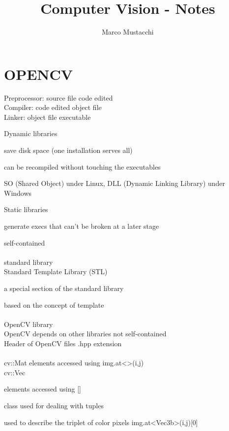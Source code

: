 \documentclass[11pt,english]{article}
\title:
\title{\vspace{-1.6cm}\textbf{Computer Vision - Notes}}
\author{Marco Mustacchi}
\date{}
\begin{document}
\maketitle

\section{OPENCV}

Preprocessor: source file \makebox[0.5cm]{\textrightarrow} code edited \\
Compiler: code edited \makebox[0.5cm]{\textrightarrow} object file \\
Linker: object file \makebox[0.5cm]{\makebox[0.5cm]{\textrightarrow}} executable \\

\medskip

Dynamic libraries \par
    \makebox[1.5cm]{\textrightarrow}  save disk space (one installation serves all)\par
    \makebox[1.5cm]{\textrightarrow}  can be recompiled without touching the executables\par
    \makebox[1.5cm]{\textrightarrow}  SO (Shared Object) under Linux, DLL (Dynamic Linking Library) under Windows\par

Static libraries \par
    \makebox[1.5cm]{\textrightarrow}  generate execs that can't be broken at a later stage\par
    \makebox[1.5cm]{\textrightarrow}  self-contained\\
\\
standard library \\
Standard Template Library (STL) \par
    \makebox[1.5cm]{\textrightarrow}  a special section of the standard library\par
    \makebox[1.5cm]{\textrightarrow}  based on the concept of template\\
\\
OpenCV library \\
OpenCV depends on other libraries \makebox[0.5cm]{\textrightarrow} not self-contained \\
Header of OpenCV files \makebox[0.5cm]{\textrightarrow} .hpp extension \\
\\
cv::Mat \makebox[0.5cm]{\textrightarrow} elements accessed using img.at<>(i,j) \\
cv::Vec \par
    \makebox[1.5cm]{\textrightarrow}  elements accessed using [] \par
    \makebox[1.5cm]{\textrightarrow}  class used for dealing with tuples\par
    \makebox[1.5cm]{\textrightarrow}  used to describe the triplet of color pixels img.at<Vec3b>(i,j)[0]\par
\end{document}
